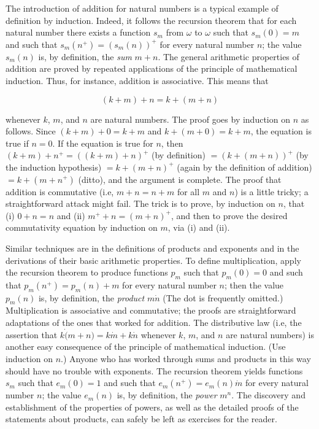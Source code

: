 
The introduction of addition for natural numbers is a typical example of definition by induction. Indeed, it follows the recursion theorem that for each natural number there exists a function $s_{m}$ from $\omega$ to $\omega$ such that $s_{m}(0) = m$ and such that $s_{m}(n^{+}) = (s_{m}(n))^{+}$ for every natural number $n$; the value $s_{m}(n)$ is, by definition, the \textit{sum} $m + n$. The general arithmetic properties of addition are proved by repeated applications of the principle of mathematical induction. Thus, for instance, addition is associative. This means that 

\begin{equation*}
(k + m) + n = k + (m + n) 
\end{equation*}

whenever $k$, $m$, and $n$ are natural numbers. The proof goes by induction on $n$ as follows. Since $(k + m) + 0 = k + m$ and $k + (m + 0) = k + m$, the equation is true if $n = 0$. If the equation is true for $n$, then $(k + m) + n^{+} = ((k+ m) + n)^{+}$ (by definition) $ = (k + (m + n))^{+}$ (by the induction hypothesis) $ = k + (m + n)^{+}$ (again by the definition of addition) $ = k + (m + n^{+})$ (ditto), and the argument is complete. The proof that addition is commutative (i.e, $m + n = n+ m$ for all $m$ and $n$) is a little tricky; a straightforward attack might fail. The trick is to prove, by induction on $n$, that (i) $0 + n = n$ and (ii) $m^{+} + n =  (m + n)^{+}$, and then to prove the desired commutativity equation by induction on $m$, via (i) and (ii). 

Similar techniques are in the definitions of products and exponents and in the derivations of their basic arithmetic properties. To define multiplication, apply the recursion theorem to produce functions $p_{m}$ such that $p_{m}(0) = 0$ and such that $p_{m}(n^{+}) = p_{m}(n) + m$ for every natural number $n$; then the value $p_{m}(n)$ is, by definition, the \textit{product} $m \dot n$ (The dot is frequently omitted.) Multiplication is associative and commutative; the proofs are straightforward adaptations of the ones that worked for addition. The distributive law (i.e, the assertion that $k \dot (m + n)  = k \dot m + k \dot n$ whenever $k$, $m$, and $n$ are natural numbers) is another easy consequence of the principle of mathematical induction. (Use induction on $n$.) Anyone who has worked through sums and products in this way should have no trouble with exponents. The recursion theorem yields functions $s_{m}$ such that $e_{m}(0) = 1$ and such that $e_{m}(n^{+}) = e_{m}(n) \dot m$ for every natural number $n$; the value $e_{m}(n)$ is, by definition, the \textit{power} $m^{n}$. The discovery and establishment of the properties of powers, as well as the detailed proofs of the statements about products, can safely be left as exercises for the reader.

